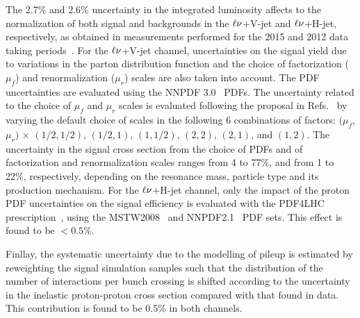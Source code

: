 The 2.7\% and 2.6\% uncertainty in the integrated luminosity affects to the normalization of both signal and backgrounds in the $\ell\nu$+V-jet and $\ell\nu$+H-jet, respectively, as obtained in measurements performed for the 2015 and 2012 data taking periods~\cite{CMS-PAS-LUM-15-001,CMS:LUM13001}. 
For the $\ell\nu$+V-jet channel, uncertainties on the signal yield due to variations in the parton distribution function and the choice of factorization ($\mu_{f}$) and renormalization ($\mu_{r}$) scales are also taken into account.
The PDF uncertainties are evaluated using the NNPDF 3.0~\cite{Ball:2011mu} PDFs.
The uncertainty related to the choice of $\mu_{f}$ and $\mu_{r}$ scales is evaluated following the proposal in Refs.~\cite{Cacciari:2003fi,Catani:2003zt} by varying the default choice of scales in the following 6 combinations of factors:
$(\mu_{f}$, $\mu_{r})$ $\times$ $(1/2, 1/2)$, $(1/2, 1)$, $(1,1/2)$, $(2, 2)$, $(2, 1)$, and $(1, 2)$.
The uncertainty in the signal cross section from the choice of PDFs and of factorization and renormalization scales ranges from 4 to 77\%, and from 1 to 22\%, respectively, depending on the resonance mass, particle type and its production mechanism.
For the $\ell\nu$+H-jet channel, only the impact of the proton PDF uncertainties on the signal efficiency is evaluated with the PDF4LHC prescription~\cite{Botje:2011sn,Alekhin:2011sk}, using the MSTW2008~\cite{MSTW} and NNPDF2.1~\cite{NNPDF} PDF sets. This effect is found to be $< 0.5\%$.

Finllay, the systematic uncertainty due to the modelling of pileup is estimated by reweighting the signal simulation samples such that the distribution of the number of interactions per bunch crossing is shifted according to the uncertainty in the inelastic proton-proton cross section compared with that found in data. This contribution is found to be 0.5\% in both channels.

